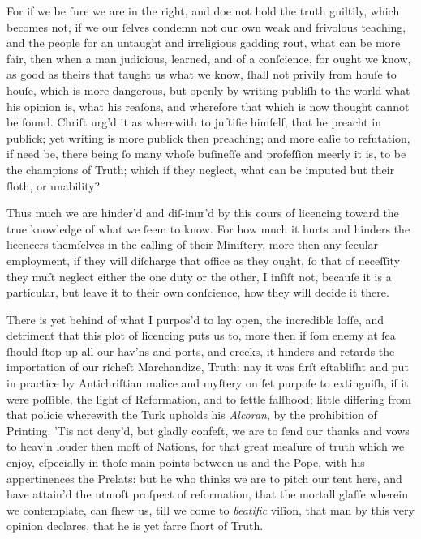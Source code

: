 For if we be ſure we are in the right, and doe not hold the truth guiltily,
which becomes not, if we our ſelves condemn not our own weak and frivolous
teaching, and the people for an untaught and irreligious gadding rout, what can
be more fair, then when a man judicious, learned, and of a conſcience, for ought
we know, as good as theirs that taught us what we know, ſhall not privily from
houſe to houſe, which is more dangerous, but openly by writing publiſh to the
world what his opinion is, what his reaſons, and wherefore that which is now
thought cannot be ſound.  Chriſt urg'd it as wherewith to juſtifie himſelf, that
he preacht in publick; yet writing is more publick then preaching; and more
eaſie to refutation, if need be, there being ſo many whoſe buſineſſe and
profeſſion meerly it is, to be the champions of Truth; which if they neglect,
what can be imputed but their ſloth, or unability?

Thus much we are hinder'd and diſ-inur'd by this cours of licencing toward the
true knowledge of what we ſeem to know.  For how much it hurts and hinders the
licencers themſelves in the calling of their Miniſtery, more then any ſecular
employment, if they will diſcharge that office as they ought, ſo that of
neceſſity they muſt neglect either the one duty or the other, I inſiſt not,
becauſe it is a particular, but leave it to their own conſcience, how they will
decide it there.

There is yet behind of what I purpos'd to lay open, the incredible loſſe, and
detriment that this plot of licencing puts us to, more then if ſom enemy at ſea
ſhould ſtop up all our hav'ns and ports, and creeks, it hinders and retards the
importation of our richeſt Marchandize, Truth: nay it was firſt eſtabliſht and
put in practice by Antichriſtian malice and myſtery on ſet purpoſe to
extinguiſh, if it were poſſible, the light of Reformation, and to ſettle
falſhood; little differing from that policie wherewith the Turk upholds his
\textit{Alcoran}, by the prohibition of Printing.  'Tis not deny'd, but gladly
confeſt, we are to ſend our thanks and vows to heav'n louder then moſt of
Nations, for that great meaſure of truth which we enjoy, eſpecially in thoſe
main points between us and the Pope, with his appertinences the Prelats: but he
who thinks we are to pitch our tent here, and have attain'd the utmoſt proſpect
of reformation, that the mortall glaſſe wherein we contemplate, can ſhew us,
till we come to \textit{beatific} viſion, that man by this very opinion
declares, that he is yet farre ſhort of Truth.


